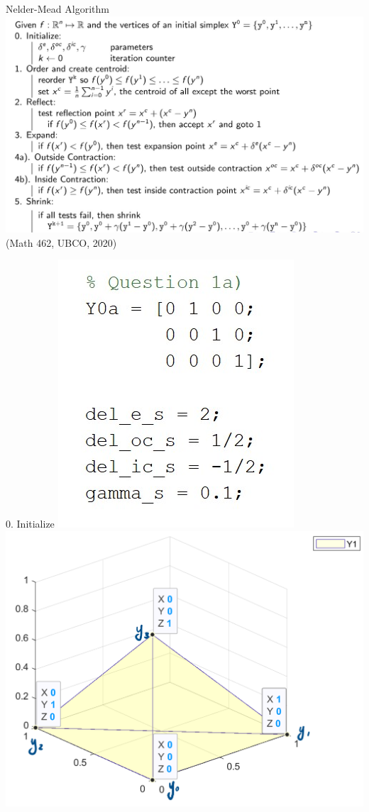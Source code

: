 \documentclass{beamer}
\begin{document}
\begin{frame}{Nelder-Mead Algorithm}
    \centering
    \includegraphics[width=0.95\linewidth]{NMAlgorithm}\\
	\hfill \tiny (Math 462, UBCO, 2020) 
\end{frame}

\begin{frame}{0. Initialize}
	\centering
	\includegraphics[width=0.35\linewidth]{Initialize}
	\includegraphics[width=0.59\linewidth]{InitializeFig}
\end{frame}
\end{document}
